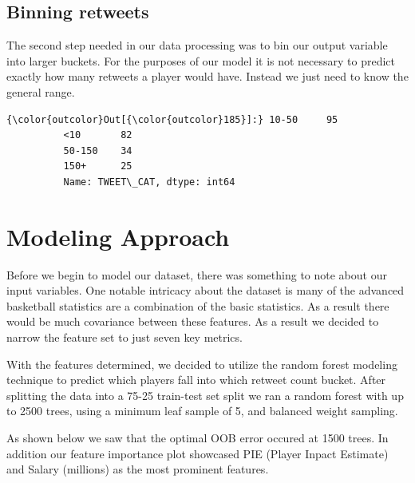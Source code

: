 \documentclass[11pt]{article}
\begin{document}
    
    \subsection{Binning retweets}\label{binning-retweets}

The second step needed in our data processing was to bin our output
variable into larger buckets. For the purposes of our model it is not
necessary to predict exactly how many retweets a player would have.
Instead we just need to know the general range.


\begin{Verbatim}[commandchars=\\\{\}]
{\color{outcolor}Out[{\color{outcolor}185}]:} 10-50     95
          <10       82
          50-150    34
          150+      25
          Name: TWEET\_CAT, dtype: int64
\end{Verbatim}
            
    \section{Modeling Approach}\label{modeling-approach}

Before we begin to model our dataset, there was something to note about
our input variables. One notable intricacy about the dataset is many of
the advanced basketball statistics are a combination of the basic
statistics. As a result there would be much covariance between these
features. As a result we decided to narrow the feature set to just seven
key metrics.

With the features determined, we decided to utilize the random forest
modeling technique to predict which players fall into which retweet
count bucket. After splitting the data into a 75-25 train-test set split we
ran a random forest with up to 2500 trees, using a minimum leaf sample
of 5, and balanced weight sampling.

As shown below we saw that the optimal OOB error occured at 1500 trees.
In addition our feature importance plot showcased PIE (Player Inpact
Estimate) and Salary (millions) as the most prominent features.

\pagebreak
\end{document}
